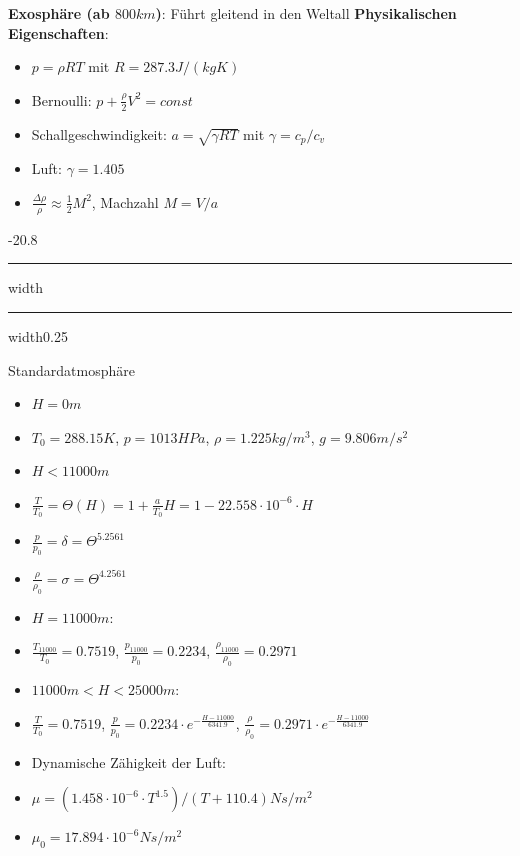 \documentclass[8pt, landscape, fleqn]{scrartcl}
\makeatletter
\renewcommand{\subsection}{\@startsection{subsection}{1}{0mm}%
{-2\baselineskip}{0.8\baselineskip}%
{\hrule depth 0.2pt width\columnwidth\hrule depth0.75pt
width0.25\columnwidth\vspace*{1.2em}\large\bfseries\rmfamily}}
\makeatother
\begin{document}
\begin{multicols*}{3}
\textbf{Exosphäre (ab $800 km$)}: Führt gleitend in den Weltall
\newline \newline
\textbf{Physikalischen Eigenschaften}:
\begin{itemize}
\item $p = \rho R T$ mit $R = 287.3 J/(kg K)$ 
\item Bernoulli: $p + \frac{\rho}{2}V^2 = const$
\item Schallgeschwindigkeit: $a = \sqrt{\gamma R T}$ mit $\gamma = c_p / c_v$
\item Luft: $\gamma = 1.405$
\item $\frac{\Delta \rho}{\rho} \approx \frac{1}{2} M^2$, Machzahl $M = V/a$
\end{itemize}

\subsection{Standardatmosphäre}
\begin{itemize}
    \item $H = 0m$
    \item $T_0 = 288.15 K$, $p = 1013 HPa$, $\rho = 1.225 kg/m^3$, $g = 9.806 m/s^2$
    \item $H < 11000 m$
    \item $\frac{T}{T_0} = \Theta(H)= 1 + \frac{a}{T_0} H = 1-22.558\cdot 10^{-6} \cdot H$
    \item $\frac{p}{p_0} = \delta = \Theta^{5.2561}$
    \item $\frac{\rho}{\rho_0} = \sigma = \Theta^{4.2561}$
    \item $H = 11000 m$:
    \item $\frac{T_{11000}}{T_0} = 0.7519$, $\frac{p_{11000}}{p_0} = 0.2234$, $\frac{\rho_{11000}}{\rho_0} = 0.2971$
    \item $11000 m < H < 25000m$: 
    \item $\frac{T}{T_0}= 0.7519$, $\frac{p}{p_0} = 0.2234 \cdot e^{-\frac{H-11000}{6341.9}}$, $\frac{\rho}{\rho_0} = 0.2971 \cdot e^{-\frac{H-11000}{6341.9}}$
    \item Dynamische Zähigkeit der Luft:
    \item $\mu = (1.458\cdot 10^{-6}\cdot T^{1.5})/(T+110.4) Ns/m^2$
    \item $\mu_0 = 17.894 \cdot 10^{-6} Ns/m^2$
\end{itemize}


\end{multicols*}
\end{document}
